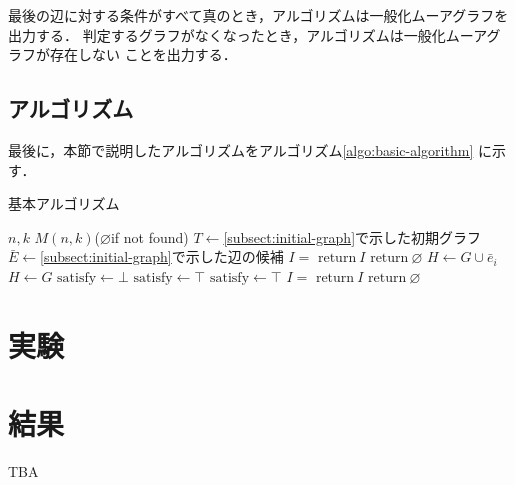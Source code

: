 最後の辺に対する条件がすべて真のとき，アルゴリズムは一般化ムーアグラフを出力する．
判定するグラフがなくなったとき，アルゴリズムは一般化ムーアグラフが存在しない
ことを出力する．

\subsection{アルゴリズム}
\label{subsect:basic-algorithm}
最後に，本節で説明したアルゴリズムをアルゴリズム\ref{algo:basic-algorithm}
に示す．
\begin{algorithm}
  \caption{基本アルゴリズム}
  \label{algo:basic-algorithm}
  \begin{algorithmic}[1]
    \Require $n,k$
    \Ensure $M(n,k)$($\varnothing$if not found)
    \State $T\gets$\ref{subsect:initial-graph}で示した初期グラフ
    \State $\bar{E}\gets$\ref{subsect:initial-graph}で示した辺の候補
    \State $I=$
    \State $\mathrm{return}\:I$
    \EndIf
    \EndFor
    \State $\mathrm{return}\:\varnothing$
    \EndProcedure
    \State $H\gets G\cup\bar{e}_i$
    \Else
    \State $H\gets G$
    \EndIf
    \State $\mathrm{satisfy}\gets\bot$
    \State $\mathrm{satisfy}\gets\top$
    \EndIf
    \State $\mathrm{satisfy}\gets\top$
    \EndIf
    \State $I=$
    \State $\mathrm{return}\:I$
    \EndIf
    \EndFor
    \Else
    \State $\mathrm{return}\:\varnothing$
    \EndIf
    \EndProcedure
  \end{algorithmic}
\end{algorithm}

\section{実験}
\label{sect:exp-basic-algorithm}

\section{結果}
\label{sect:result-basic-algorithm}
TBA
